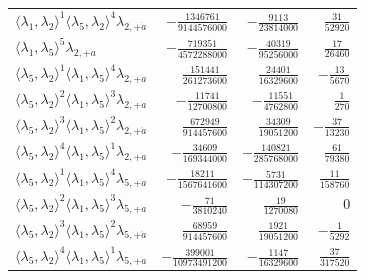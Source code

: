 \begin{longtable}{@{}lrrr@{}}
$\langle\lambda_1,\lambda_2\rangle^{1}\langle\lambda_5,\lambda_2\rangle^{4}\lambda_{2,+\dot a}$ & $-\frac{1346761}{9144576000}$ & $-\frac{9113}{23814000}$ & $\frac{31}{52920}$ \\
$\langle\lambda_1,\lambda_5\rangle^{5}\lambda_{2,+\dot a}$ & $-\frac{719351}{4572288000}$ & $-\frac{40319}{95256000}$ & $\frac{17}{26460}$ \\
$\langle\lambda_5,\lambda_2\rangle^{1}\langle\lambda_1,\lambda_5\rangle^{4}\lambda_{2,+\dot a}$ & $\frac{151441}{261273600}$ & $\frac{24401}{16329600}$ & $-\frac{13}{5670}$ \\
$\langle\lambda_5,\lambda_2\rangle^{2}\langle\lambda_1,\lambda_5\rangle^{3}\lambda_{2,+\dot a}$ & $-\frac{11741}{12700800}$ & $-\frac{11551}{4762800}$ & $\frac{1}{270}$ \\
$\langle\lambda_5,\lambda_2\rangle^{3}\langle\lambda_1,\lambda_5\rangle^{2}\lambda_{2,+\dot a}$ & $\frac{672949}{914457600}$ & $\frac{34309}{19051200}$ & $-\frac{37}{13230}$ \\
$\langle\lambda_5,\lambda_2\rangle^{4}\langle\lambda_1,\lambda_5\rangle^{1}\lambda_{2,+\dot a}$ & $-\frac{34609}{169344000}$ & $-\frac{140821}{285768000}$ & $\frac{61}{79380}$ \\
$\langle\lambda_5,\lambda_2\rangle^{1}\langle\lambda_1,\lambda_5\rangle^{4}\lambda_{5,+\dot a}$ & $-\frac{18211}{1567641600}$ & $-\frac{5731}{114307200}$ & $\frac{11}{158760}$ \\
$\langle\lambda_5,\lambda_2\rangle^{2}\langle\lambda_1,\lambda_5\rangle^{3}\lambda_{5,+\dot a}$ & $-\frac{71}{3810240}$ & $\frac{19}{1270080}$ & $0$ \\
$\langle\lambda_5,\lambda_2\rangle^{3}\langle\lambda_1,\lambda_5\rangle^{2}\lambda_{5,+\dot a}$ & $\frac{68959}{914457600}$ & $\frac{1921}{19051200}$ & $-\frac{1}{5292}$ \\
$\langle\lambda_5,\lambda_2\rangle^{4}\langle\lambda_1,\lambda_5\rangle^{1}\lambda_{5,+\dot a}$ & $-\frac{399001}{10973491200}$ & $-\frac{1147}{16329600}$ & $\frac{37}{317520}$ \\
\end{longtable}
